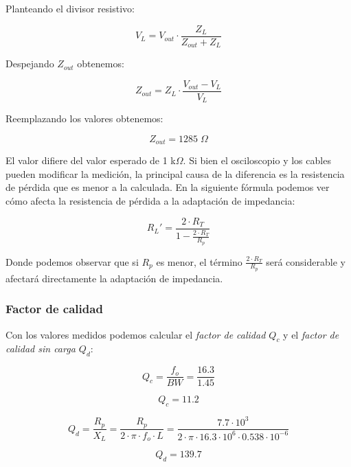 Planteando el divisor resistivo:

\begin{equation}
    V_{L} = V_{out} \cdot \frac{Z_{L}}{Z_{out} + Z_L}
\end{equation}

Despejando $Z_{out}$ obtenemos:

\begin{equation}
    Z_{out} = Z_L \cdot \frac{V_{out} - V_L}{V_L}
\end{equation}

Reemplazando los valores obtenemos:

\begin{equation}
    \boxed{Z_{out} = 1285\; \Omega}
\end{equation}

El valor difiere del valor esperado de 1 k$\Omega$. Si bien el osciloscopio y los cables pueden modificar la medición, la principal causa de la diferencia es la resistencia de pérdida
que es menor a la calculada. En la siguiente fórmula podemos ver cómo afecta la resistencia de pérdida a la adaptación de impedancia:

\begin{equation}
    R_L' = \frac{2 \cdot R_T}{1 - \frac{2 \cdot R_T}{R_p}}
\end{equation}

Donde podemos observar que si $R_p$ es menor, el término $\frac{2 \cdot R_T}{R_p}$ será considerable y afectará directamente la adaptación de impedancia. 

\subsubsection{Factor de calidad}

Con los valores medidos podemos calcular el \textit{factor de calidad $Q_c$} y el \textit{factor de calidad sin carga $Q_d$}:

\begin{equation}
    Q_c = \frac{f_o}{BW} = \frac{16.3}{1.45}
\end{equation}

\begin{equation}
    \boxed{Q_c = 11.2}
\end{equation}

\begin{equation}
    Q_d = \frac{R_p}{X_L} = \frac{R_p}{2 \cdot \pi \cdot f_o \cdot L} = \frac{7.7 \cdot 10^3}{2 \cdot \pi \cdot 16.3 \cdot 10^6 \cdot 0.538 \cdot 10^{-6}}
\end{equation}

\begin{equation}
    \boxed{Q_d = 139.7}
\end{equation}



